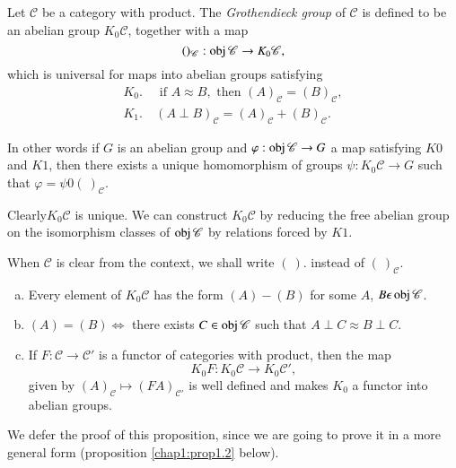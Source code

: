 \begin{defi*}%
Let $\mathscr{C}$ be a category with product. The \textit{Grothendieck
  group} of $\mathscr{C}$ is defined to be an abelian group $K_0
\mathscr{C}$, together with a map 
$$
()_{\mathscr{C}}: \operatorname{obj} \mathscr{C} \to K_0 \mathscr{C}, 
$$
which is universal for maps into abelian groups satisfying
\begin{align*}
K_0.& ~ \text{ if } A \approx B, \text{ then } (A)_{\mathscr{C}} =
(B)_\mathscr{C},\\ 
K_1. & ~ (A \perp B)_{\mathscr{C}} = (A)_{\mathscr{C}} + (B)_{\mathscr{C}}. 
\end{align*}
\end{defi*}

In other words if $G$ is an abelian group and $\varphi: \operatorname{obj}
\mathscr{C} \to G$ a map satisfying $K0$ and $K1$, then there exists
a unique homomorphism of groups $\psi : K_0 \mathscr{C} \to G$ such
that $\varphi = \psi 0 (~ )_{\mathscr{C}}$. 

Clearly\pageoriginale $K_0 \mathscr{C}$ is unique. We can construct $K_0
\mathscr{C}$ by reducing the free abelian group on the isomorphism
classes of $\operatorname{obj} \mathscr{C}$ by relations forced by $K1$. 

When $\mathscr{C}$ is clear from the context, we shall write
$(~)$. instead of $(~)_\mathscr{C}$. 

\begin{prop}\label{chap1:prop1.1}%
\begin{enumerate}[(a)]
\item  Every element of $K_0 \mathscr{C}$ has the form $(A)- (B)$ for
  some $A$, $B \epsilon \operatorname{obj} \mathscr{C}$. 

\item $(A) = (B) \Leftrightarrow$ there exists $C \in \operatorname{obj}
  \mathscr{C}$ such that $A \perp C \approx B \perp C$. 

\item If $F: \mathscr{C} \to \mathscr{C}'$ is a functor of categories
  with product, then the map 
$$
K_0 F: K_0 \mathscr{C} \to K_0 \mathscr{C}', 
$$
 given by $(A)_{\mathscr{C}} \longmapsto (FA)_{\mathscr{C'}}$ is well
  defined and makes $K_0$ a functor into abelian groups. 
\end{enumerate}
\end{prop}

We defer the proof of this proposition, since we are going to prove it
in a more general form (proposition \ref{chap1:prop1.2} below). 

